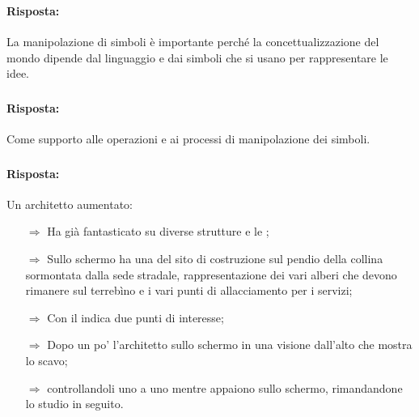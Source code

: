 \subsubsection{}


\paragraph{Risposta:} La manipolazione di simboli è importante perché la concettualizzazione del 
mondo dipende dal linguaggio e dai simboli che si usano per rappresentare le idee.

\subsubsection{}


\paragraph{Risposta:} Come supporto alle operazioni e ai processi di manipolazione dei simboli.

\subsubsection{}


\paragraph{Risposta:} Un architetto aumentato:

\begin{itemize}
    \item [$\Rightarrow$] Ha già fantasticato su diverse strutture e le ;
    \item [$\Rightarrow$] Sullo schermo ha una  del sito di costruzione sul 
    pendio della collina sormontata dalla sede stradale, rappresentazione dei vari alberi che devono rimanere
    sul terrebìno e i vari punti di allacciamento per i servizi;
    \item [$\Rightarrow$] Con il  indica due punti di interesse;
    \item [$\Rightarrow$] Dopo un po' l'architetto  sullo schermo in una visione dall'alto che mostra lo scavo;
    \item [$\Rightarrow$]  controllandoli uno a uno mentre appaiono sullo schermo, rimandandone lo studio in seguito.
\end{itemize}

